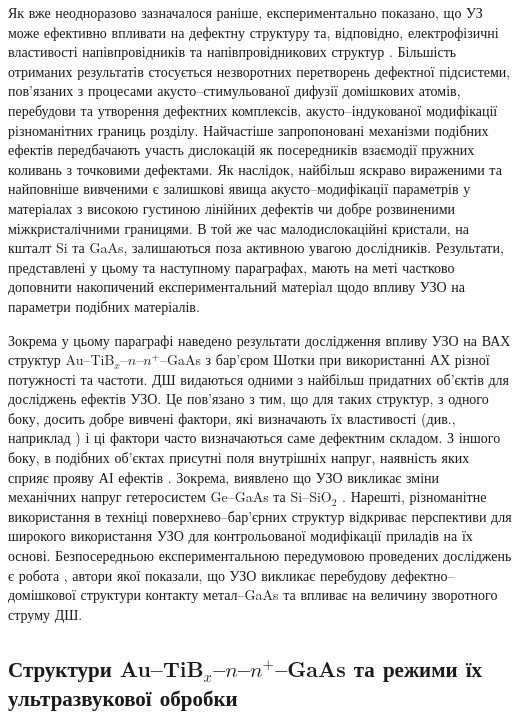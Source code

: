 \documentclass[a4paper,14pt,oneside,openany]{memoir}
\begin{document}
Як вже неодноразово зазначалося раніше, експериментально показано, що УЗ може ефективно впливати на дефектну структуру та, відповідно, електрофізичні властивості напівпровідників та напівпровідникових структур \cite{Parchinskii2000r,Zaver,OlikhFTT,Parchinskii2003r,Ostrov2002FTPr,UST:SDErmol}.
Більшість отриманих результатів стосується незворотних перетворень  дефектної підсистеми, пов'язаних з процесами акусто--стимульованої дифузії домішкових атомів,  перебудови та утворення дефектних комплексів,  акусто--індукованої модифікації різноманітних границь розділу.
Найчастіше запропоновані механізми подібних ефектів передбачають участь дислокацій як посередників взаємодії пружних коливань з точковими дефектами.
Як наслідок, найбільш яскраво вираженими та найповніше вивченими є залишкові явища акусто--модифікації параметрів у матеріалах з високою густиною лінійних дефектів чи добре розвиненими міжкристалічними границями.
В той же час малодислокаційні кристали, на кшталт Si та GaAs, залишаються поза активною увагою дослідників.
Результати, представлені у цьому та наступному параграфах, мають на меті частково доповнити
накопичений експериментальний матеріал щодо впливу УЗО на параметри подібних матеріалів.

Зокрема у цьому параграфі наведено результати дослідження впливу УЗО
на ВАХ  структур Au--TiB$_x$--$n$--$n^+$--GaAs з бар’єром Шотки при використанні АХ різної потужності та частоти.
ДШ видаються одними з найбільш придатних об’єктів для досліджень ефектів УЗО.
Це пов’язано з тим, що для таких структур, з одного боку, досить добре вивчені фактори, які визначають їх властивості (див., наприклад \cite{Sze2012,Rhoderick1988,Singh1994,Evstropov2000,PipinsFTP})
і ці фактори часто визначаються саме дефектним складом.
З іншого боку, в подібних об’єктах присутні поля внутрішніх напруг, наявність яких сприяє прояву АІ ефектів \cite{Parchinskii2003r,Ostrov2002FTPr}.
Зокрема, виявлено що УЗО викликає зміни механічних напруг гетеросистем Ge--GaAs та Si--SiO$_2$ \cite{BritunFTT,Zdeb1989}.
Нарешті, різноманітне використання в техніці поверхнево--бар’єрних структур відкриває перспективи для широкого використання УЗО для контрольованої модифікації приладів на їх основі.
Безпосередньою експериментальною передумовою проведених досліджень є робота \cite{UST:SDErmol},
автори якої показали, що УЗО викликає перебудову дефектно--домішкової структури контакту метал--GaAs та впливає на величину зворотного струму ДШ.


\subsection{Структури Au--TiB$_x$--$n$--$n^+$--GaAs та режими їх ультразвукової обробки}
\end{document}
